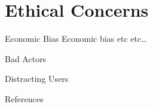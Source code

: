 \documentclass{beamer}
\begin{document}
\section{Ethical Concerns}

\begin{frame}{Economic Bias}
Economic bias etc etc\dots
\end{frame}

\begin{frame}{Bad Actors}

\end{frame}

\begin{frame}{Distracting Users}

\end{frame}

\begin{frame}[allowframebreaks]{References}
    \printbibliography
\end{frame}
\end{document}
